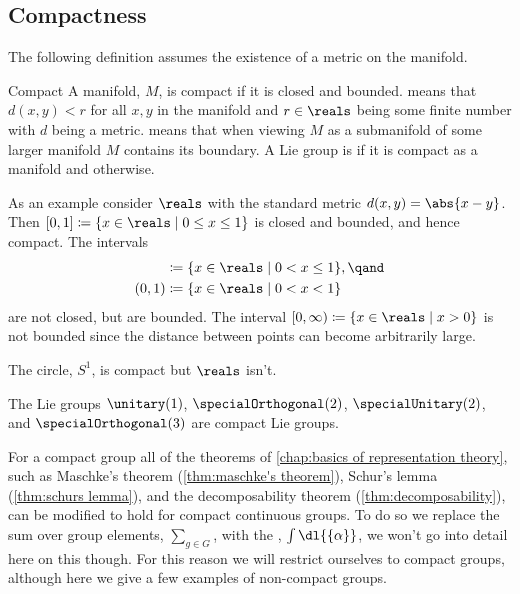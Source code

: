 \subsection{Compactness}    
The following definition assumes the existence of a metric on the manifold.
\begin{dfn}{Compact}{}
    A manifold, \(M\), is compact if it is closed and bounded.
     means that \(d(x, y) < r\) for all \(x, y\) in the manifold and \(r \in \reals\) being some finite number with \(d\) being a metric.
     means that when viewing \(M\) as a submanifold of some larger manifold \(M\) contains its boundary.
    A Lie group is  if it is compact as a manifold and  otherwise.
\end{dfn}

As an example consider \(\reals\) with the standard metric \(d(x, y) = \abs{x - y}\).
Then \([0, 1] \coloneqq \{x \in \reals \mid 0 \le x \le 1\}\) is closed and bounded, and hence compact.
The intervals
\begin{align}
    [0, 1) &\coloneqq \{x \in \reals \mid 0 \le x < 1\},\\
    (0, 1] &\coloneqq \{x \in \reals \mid 0 < x \le 1\}, \qand\\
    (0, 1) &\coloneqq \{x \in \reals \mid 0 < x < 1\}
\end{align}
are not closed, but are bounded.
The interval \([0, \infty) \coloneqq \{x \in \reals \mid x > 0\}\) is not bounded since the distance between points can become arbitrarily large.

The circle, \(S^1\), is compact but \(\reals\) isn't.

\begin{exm}{}{}
    The Lie groups \(\unitary(1)\), \(\specialOrthogonal(2)\), \(\specialUnitary(2)\), and \(\specialOrthogonal(3)\) are compact Lie groups.
\end{exm}

For a compact group all of the theorems of \cref{chap:basics of representation theory}, such as Maschke's theorem (\cref{thm:maschke's theorem}), Schur's lemma (\cref{thm:schurs lemma}), and the decomposability theorem (\cref{thm:decomposability}), can be modified to hold for compact continuous groups.
To do so we replace the sum over group elements, \(\sum_{g\in G}\), with the , \(\int \dl{\{\alpha\}}\), we won't go into detail here on this though.
For this reason we will restrict ourselves to compact groups, although here we give a few examples of non-compact groups.

